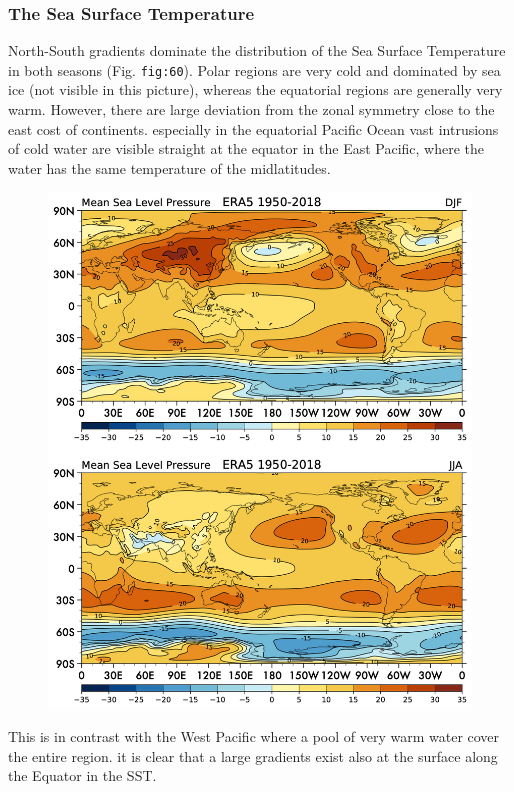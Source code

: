 
\subsubsection{The Sea Surface
	Temperature}\label{the-sea-surface-temperature}

North-South gradients dominate the distribution of the Sea Surface
Temperature in both seasons (Fig. \texttt{fig:60}). Polar regions are
very cold and dominated by sea ice (not visible in this picture),
whereas the equatorial regions are generally very warm. However, there
are large deviation from the zonal symmetry close to the east cost of
continents. especially in the equatorial Pacific Ocean vast intrusions
of cold water are visible straight at the equator in the East Pacific,
where the water has the same temperature of the midlatitudes.

\begin{figure}
	\centering
	\includegraphics[width = .7 \textwidth]{figs/GD/MSL.png}
	\caption{}\label{}
\end{figure}

This is in contrast with the West Pacific where a pool of very warm
water cover the entire region. it is clear that a large gradients exist
also at the surface along the Equator in the SST.

